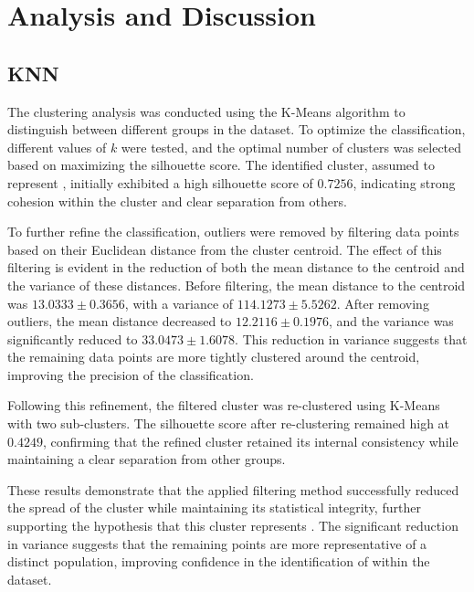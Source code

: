 \chapter{Analysis and Discussion}

\section{KNN}

The clustering analysis was conducted using the K-Means algorithm to distinguish between different groups in the dataset. To optimize the classification, different values of \( k \) were tested, and the optimal number of clusters was selected based on maximizing the silhouette score. The identified cluster, assumed to represent , initially exhibited a high silhouette score of \( 0.7256 \), indicating strong cohesion within the cluster and clear separation from others.

To further refine the classification, outliers were removed by filtering data points based on their Euclidean distance from the cluster centroid. The effect of this filtering is evident in the reduction of both the mean distance to the centroid and the variance of these distances. Before filtering, the mean distance to the centroid was \( 13.0333 \pm 0.3656 \), with a variance of \( 114.1273 \pm 5.5262 \). After removing outliers, the mean distance decreased to \( 12.2116 \pm 0.1976 \), and the variance was significantly reduced to \( 33.0473 \pm 1.6078 \). This reduction in variance suggests that the remaining data points are more tightly clustered around the centroid, improving the precision of the classification.

Following this refinement, the filtered cluster was re-clustered using K-Means with two sub-clusters. The silhouette score after re-clustering remained high at \( 0.4249 \), confirming that the refined cluster retained its internal consistency while maintaining a clear separation from other groups. 

These results demonstrate that the applied filtering method successfully reduced the spread of the cluster while maintaining its statistical integrity, further supporting the hypothesis that this cluster represents . The significant reduction in variance suggests that the remaining points are more representative of a distinct population, improving confidence in the identification of  within the dataset.





\newpage